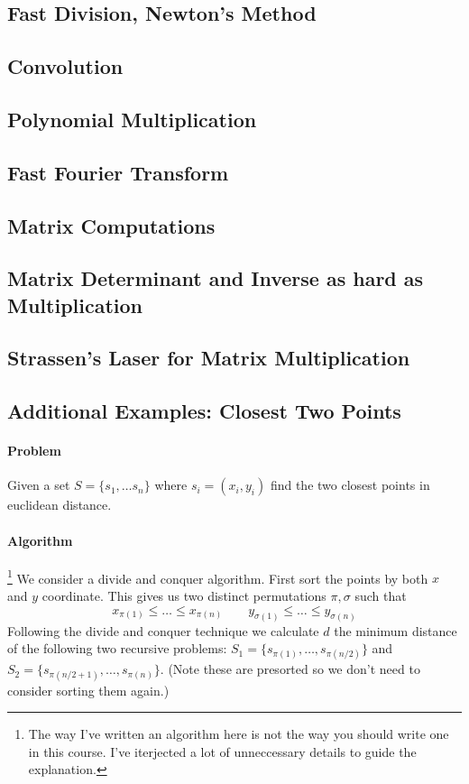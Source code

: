 \documentclass[11pt]{article}
\theoremstyle{plain}
\theoremstyle{definition}
\numberwithin{equation}{section}
\numberwithin{figure}{section}
\begin{document}
\subsection{Fast Division, Newton's Method}

\subsection{Convolution}

\subsection{Polynomial Multiplication}

\subsection{Fast Fourier Transform}

\subsection{Matrix Computations}

\subsection{Matrix Determinant and Inverse as hard as Multiplication}

\subsection{Strassen's Laser for Matrix Multiplication}

\subsection{Additional Examples: Closest Two Points}

\paragraph{Problem} Given a set $S = \{s_1, \ldots s_n\}$ where $s_i = (x_i, y_i)$ find the two closest points in euclidean distance.

\paragraph{Algorithm}\footnote{The way I've written an algorithm here is not the way you should write one in this course. I've iterjected a lot of unneccessary details to guide the explanation.} We consider a divide and conquer algorithm. First sort the points by both $x$ and $y$ coordinate. This gives us two distinct permutations $\pi, \sigma$ such that
\begin{equation}
x_{\pi(1)} \leq \ldots \leq x_{\pi(n)} \qquad y_{\sigma(1)} \leq \ldots \leq y_{\sigma(n)}
\end{equation}
Following the divide and conquer technique we calculate $d$ the minimum distance of the following two recursive problems: $S_1 = \{s_{\pi(1)}, \ldots, s_{\pi(n/2)}\}$ and $S_2 = \{s_{\pi(n/2 + 1)}, \ldots, s_{\pi(n)}\}$. (Note these are presorted so we don't need to consider sorting them again.) \\
\end{document}
